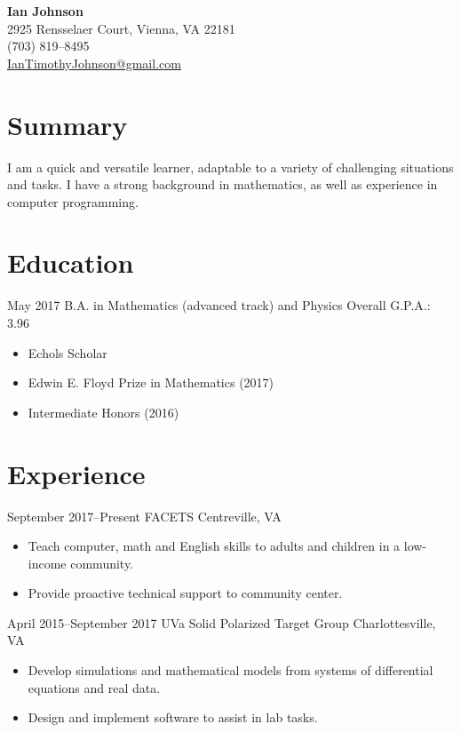 \documentclass[10pt]{article}
\begin{document}
\begin{center}
  {\Large\bfseries Ian Johnson} \\
  2925 Rensselaer Court, Vienna, VA 22181 \\
  (703) 819--8495 \\
  \href{mailto:IanTimothyJohnson@gmail.com}{IanTimothyJohnson@gmail.com}
\end{center}

\section*{Summary}
I am a quick and versatile learner, adaptable to a variety of challenging
situations and tasks.  I have a strong background in mathematics, as well as
experience in computer programming.

\section*{Education}
{May 2017}
{B.A. in Mathematics (advanced track) and Physics}
{Overall G.P.A.: 3.96}
\begin{itemize}
\item Echols Scholar
\item Edwin E. Floyd Prize in Mathematics (2017)
\item Intermediate Honors (2016)
\end{itemize}

\section*{Experience}
{September 2017--Present}
{FACETS}
{Centreville, VA}
\begin{itemize}
\item Teach computer, math and English skills to adults and children
  in a low-income community.
\item Provide proactive technical support to community center.
\end{itemize}

{April 2015--September 2017}
{UVa Solid Polarized Target Group}
{Charlottesville, VA}
\begin{itemize}
\item Develop simulations and mathematical models from systems of
  differential equations and real data.
\item Design and implement software to assist in lab tasks.
\end{itemize}
\end{document}
